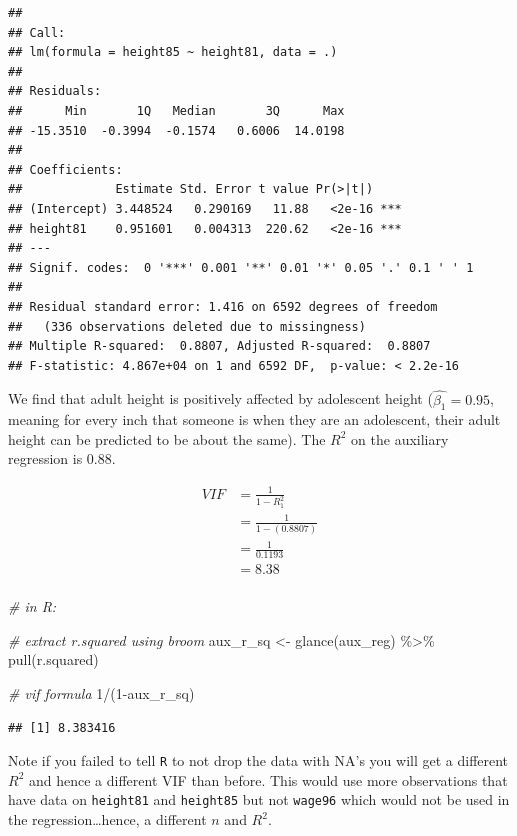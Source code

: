 \documentclass[
]{article}
\newenvironment{Shaded}{\begin{snugshade}}{\end{snugshade}}
\newcommand{\CommentTok}[1]{\textcolor[rgb]{0.56,0.35,0.01}{\textit{#1}}}
\newcommand{\DecValTok}[1]{\textcolor[rgb]{0.00,0.00,0.81}{#1}}
\newcommand{\FunctionTok}[1]{\textcolor[rgb]{0.00,0.00,0.00}{#1}}
\newcommand{\NormalTok}[1]{#1}
\newcommand{\OtherTok}[1]{\textcolor[rgb]{0.56,0.35,0.01}{#1}}
\newcommand{\SpecialCharTok}[1]{\textcolor[rgb]{0.00,0.00,0.00}{#1}}
\begin{document}
\begin{verbatim}
## 
## Call:
## lm(formula = height85 ~ height81, data = .)
## 
## Residuals:
##      Min       1Q   Median       3Q      Max 
## -15.3510  -0.3994  -0.1574   0.6006  14.0198 
## 
## Coefficients:
##             Estimate Std. Error t value Pr(>|t|)    
## (Intercept) 3.448524   0.290169   11.88   <2e-16 ***
## height81    0.951601   0.004313  220.62   <2e-16 ***
## ---
## Signif. codes:  0 '***' 0.001 '**' 0.01 '*' 0.05 '.' 0.1 ' ' 1
## 
## Residual standard error: 1.416 on 6592 degrees of freedom
##   (336 observations deleted due to missingness)
## Multiple R-squared:  0.8807, Adjusted R-squared:  0.8807 
## F-statistic: 4.867e+04 on 1 and 6592 DF,  p-value: < 2.2e-16
\end{verbatim}

We find that adult height is positively affected by adolescent height
(\(\hat{\beta_1}=0.95\), meaning for every inch that someone is when
they are an adolescent, their adult height can be predicted to be about
the same). The \(R^2\) on the auxiliary regression is 0.88.

\[\begin{align*}
    VIF&=\frac{1}{1-R^2_1}\\
        &=\frac{1}{1-(0.8807)}\\
        &=\frac{1}{0.1193}\\
        &=8.38\\
\end{align*}\]

\begin{Shaded}
\begin{Highlighting}[]
\CommentTok{\# in R: }

\CommentTok{\# extract r.squared using broom}
\NormalTok{aux\_r\_sq }\OtherTok{\textless{}{-}} \FunctionTok{glance}\NormalTok{(aux\_reg) }\SpecialCharTok{\%\textgreater{}\%}
  \FunctionTok{pull}\NormalTok{(r.squared)}

\CommentTok{\# vif formula}
\DecValTok{1}\SpecialCharTok{/}\NormalTok{(}\DecValTok{1}\SpecialCharTok{{-}}\NormalTok{aux\_r\_sq)}
\end{Highlighting}
\end{Shaded}

\begin{verbatim}
## [1] 8.383416
\end{verbatim}

Note if you failed to tell \texttt{R} to not drop the data with NA's you
will get a different \(R^2\) and hence a different VIF than before. This
would use more observations that have data on \texttt{height81} and
\texttt{height85} but not \texttt{wage96} which would not be used in the
regression\ldots hence, a different \(n\) and \(R^2\).
\end{document}
